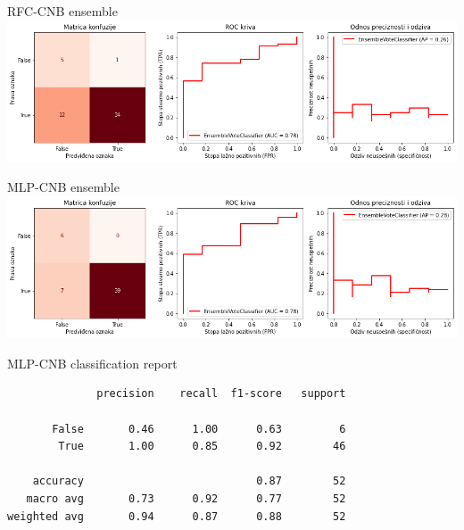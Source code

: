 \documentclass[hyperref={bookmarks=false}]{beamer}
\begin{document}
\begin{frame}{RFC-CNB ensemble}
\includegraphics[width=\textwidth]{forcnb.png}
\end{frame}

\begin{frame}{MLP-CNB ensemble}
\includegraphics[width=\textwidth]{mlpcnb.png}
\end{frame}

\begin{frame}[fragile]{MLP-CNB classification report}
\begin{lstlisting}
              precision    recall  f1-score   support

       False       0.46      1.00      0.63         6
        True       1.00      0.85      0.92        46

    accuracy                           0.87        52
   macro avg       0.73      0.92      0.77        52
weighted avg       0.94      0.87      0.88        52
\end{lstlisting}
\end{frame}
\end{document}
